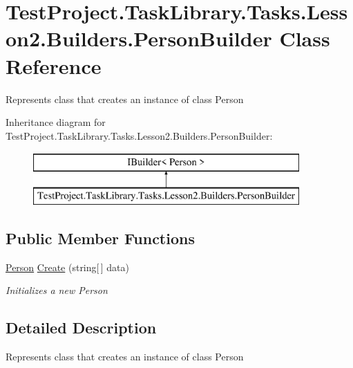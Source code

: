 \hypertarget{class_test_project_1_1_task_library_1_1_tasks_1_1_lesson2_1_1_builders_1_1_person_builder}{}\section{Test\+Project.\+Task\+Library.\+Tasks.\+Lesson2.\+Builders.\+Person\+Builder Class Reference}
\label{class_test_project_1_1_task_library_1_1_tasks_1_1_lesson2_1_1_builders_1_1_person_builder}


Represents class that creates an instance of class Person  


Inheritance diagram for Test\+Project.\+Task\+Library.\+Tasks.\+Lesson2.\+Builders.\+Person\+Builder\+:\begin{figure}[H]
\begin{center}
\leavevmode
\includegraphics[height=2.000000cm]{class_test_project_1_1_task_library_1_1_tasks_1_1_lesson2_1_1_builders_1_1_person_builder}
\end{center}
\end{figure}
\subsection*{Public Member Functions}
\begin{DoxyCompactItemize}
\item 
\mbox{\hyperlink{struct_test_project_1_1_task_library_1_1_tasks_1_1_lesson2_1_1_models_1_1_person}{Person}} \mbox{\hyperlink{class_test_project_1_1_task_library_1_1_tasks_1_1_lesson2_1_1_builders_1_1_person_builder_ae17a6e5c244c7a821283f0152275594f}{Create}} (string\mbox{[}$\,$\mbox{]} data)
\begin{DoxyCompactList}\small\item\em Initializes a new Person \end{DoxyCompactList}\end{DoxyCompactItemize}


\subsection{Detailed Description}
Represents class that creates an instance of class Person 



